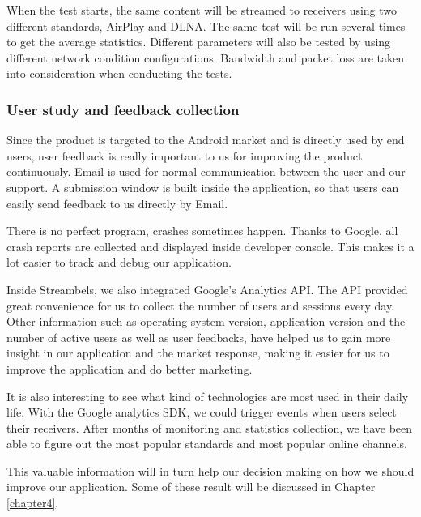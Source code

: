 When the test starts, the same content will be streamed to receivers using two different standards, AirPlay and DLNA. The same test will be run several times to get the average statistics. Different parameters will also be tested by using different network condition configurations.
Bandwidth and packet loss are taken into consideration when conducting the
tests.
\subsubsection{User study and feedback collection\label{3_7_2}}
Since the product is targeted to the Android market and is directly used by end
users, user feedback is really important to us for improving the product
continuously. Email is used for normal communication between the user and our
support. A submission window is built inside the application, so that users can
easily send feedback to us directly by Email.

There is no perfect program, crashes sometimes happen. Thanks to Google, all crash reports are collected and displayed inside developer console. This makes it a lot easier to track and debug our application.

Inside Streambels, we also integrated Google's Analytics API. The API provided
great convenience for us to collect the number of users and sessions every day.
Other information such as operating system version, application version and the
number of active users as well as user feedbacks, have helped us to gain more
insight in our application and the market response, making it easier for us to
improve the application and do better marketing.

It is also interesting to see what kind of technologies are most used in their
daily life. With the Google analytics SDK, we could trigger events when users
select their receivers. After months of monitoring and statistics collection,
we have been able to figure out the most popular standards and most popular
online channels.

This valuable information will in turn help our decision making on how we should
improve our application. Some of these result will be discussed in Chapter
\ref{chapter4}.
